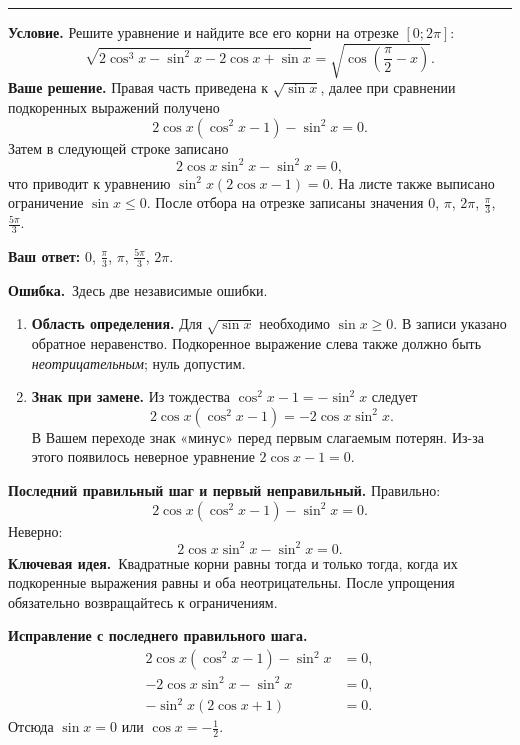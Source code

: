 \documentclass[a4paper,11pt]{article}
\newcommand{\keyidea}{\textcolor{accent}{\textbf{Ключевая идея.}}\ }
\newcommand{\errorlabel}{\textcolor{error}{\textbf{Ошибка.}}\ }
\newcommand{\tasksection}[1]{\par\vspace{8pt}{\Large\color{accent}\bfseries Задание № #1}\par\vspace{2pt}\rule{\linewidth}{0.35pt}\par}
\begin{document}
\newpage
{}\label{task:14}
\tasksection{14}
\textbf{Условие.} Решите уравнение и найдите все его корни на отрезке $[0;2\pi]$:
\[
\sqrt{2\cos^3x-\sin^2x-2\cos x+\sin x}
=\sqrt{\cos\left(\frac\pi2-x\right)}.
\]
\textbf{Ваше решение.} Правая часть приведена к $\sqrt{\sin x}$, далее при сравнении подкоренных выражений получено
\[
2\cos x(\cos^2x-1)-\sin^2x=0.
\]
Затем в следующей строке записано
\[
2\cos x\sin^2x-\sin^2x=0,
\]
что приводит к уравнению $\sin^2x(2\cos x-1)=0$. На листе также выписано ограничение $\sin x\le0$. После отбора на отрезке записаны значения $0$, $\pi$, $2\pi$, $\frac\pi3$, $\frac{5\pi}3$.

\textbf{Ваш ответ:} $0$, $\frac\pi3$, $\pi$, $\frac{5\pi}3$, $2\pi$.

\errorlabel Здесь две независимые ошибки.
\begin{enumerate}
\item \textbf{Область определения.} Для $\sqrt{\sin x}$ необходимо $\sin x\ge0$. В записи указано обратное неравенство. Подкоренное выражение слева также должно быть \emph{неотрицательным}; нуль допустим.
\item \textbf{Знак при замене.} Из тождества $\cos^2x-1=-\sin^2x$ следует
\[
2\cos x(\cos^2x-1)=-2\cos x\sin^2x.
\]
В Вашем переходе знак «минус» перед первым слагаемым потерян. Из-за этого появилось неверное уравнение $2\cos x-1=0$.
\end{enumerate}
\textbf{Последний правильный шаг и первый неправильный.} Правильно:
\[
2\cos x(\cos^2x-1)-\sin^2x=0.
\]
Неверно:
\[
2\cos x\sin^2x-\sin^2x=0.
\]
\keyidea Квадратные корни равны тогда и только тогда, когда их подкоренные выражения равны и оба неотрицательны. После упрощения обязательно возвращайтесь к ограничениям.

\textbf{Исправление с последнего правильного шага.}
\begin{align*}
2\cos x(\cos^2x-1)-\sin^2x&=0,\\
-2\cos x\sin^2x-\sin^2x&=0,\\
-\sin^2x(2\cos x+1)&=0.
\end{align*}
Отсюда $\sin x=0$ или $\cos x=-\frac12$.
\end{document}
